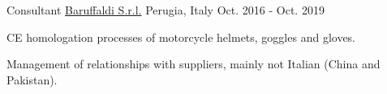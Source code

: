 \begin{cventries}
  \cventry
  {Consultant} %
  {\href{https://www.baruffaldi.net/}{Baruffaldi S.r.l.}} %
  {Perugia, Italy} %
  {Oct. 2016 - Oct. 2019} %
  {
    \begin{cvitems} %
      \item {CE homologation processes of motorcycle helmets, goggles and gloves.}
      \item {Management of relationships with suppliers, mainly not Italian (China and Pakistan).}
    \end{cvitems}
  }
\end{cventries}
